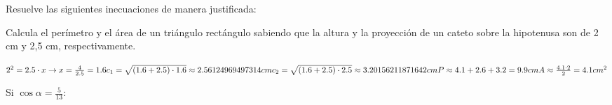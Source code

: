 \documentclass[addpoints,spanish, 12pt,a4paper]{exam}
\begin{document}
\begin{questions}

\question Resuelve las siguientes inecuaciones de manera justificada:

\addpoints

\question[2] 
Calcula el perímetro y el área de un triángulo rectángulo sabiendo que la altura y la proyección de un cateto sobre la hipotenusa son de 2 cm y 2,5 cm, respectivamente.
\begin{solution}
$ 2^2=2.5\cdot x \to x=\frac{4}{2.5}=1.6 \\
c_1=\sqrt{\left(1.6+2.5\right)\cdot 1.6}\approx2.56124969497314 cm\\
c_2=\sqrt{\left(1.6+2.5\right)\cdot 2.5}\approx3.20156211871642 cm\\
P\approx 4.1+2.6+3.2=9.9cm\\
A\approx\frac{4.1\cdot2}{2}=4.1 cm^2 
$
\end{solution}

\question Si $\cos \alpha = \frac{5}{13}$:
\end{questions}
\end{document}
